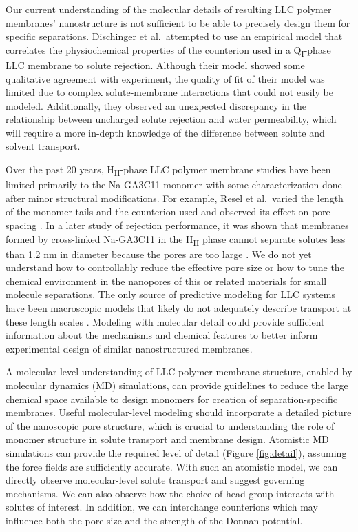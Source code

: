\documentclass[journal=jpcbfk,manuscript=article]{achemso}
\begin{document}
  Our current understanding of the molecular details of resulting LLC polymer membranes'
  nanostructure is not sufficient to be able to precisely design them for
  specific separations. Dischinger et al.~attempted to use an empirical model
  that correlates the physiochemical properties of the counterion used in a 
  Q\textsubscript{I}-phase LLC membrane to solute rejection\cite{dischinger_effect_2017}.
  Although their model showed some qualitative agreement with experiment, the
  quality of fit of their model was limited due to complex solute-membrane 
  interactions that could not easily be modeled. Additionally, they observed
  an unexpected discrepancy in the relationship between uncharged solute
  rejection and water permeability, which will require a more in-depth knowledge of
  the difference between solute and solvent transport.
  
  Over the past 20 years, H\textsubscript{II}-phase LLC
  polymer membrane studies have been limited primarily to the Na-GA3C11 monomer with some
  characterization done after minor structural modifications. For example, 
  Resel et al.~varied the length of the monomer tails and the counterion used and observed its effect
  on pore spacing \cite{resel_structural_2000}.  In a later study of rejection
  performance, it was shown that membranes formed by cross-linked Na-GA3C11 in
  the H\textsubscript{II} phase cannot separate solutes less than 1.2 nm in
  diameter because the pores are too large \cite{zhou_supported_2005}. We do not
  yet understand how to controllably reduce the effective pore size or how to
  tune the chemical environment in the nanopores of this or related materials for
  small molecule separations. The only source of predictive modeling for LLC
  systems have been macroscopic models that likely do not adequately describe
  transport at these length scales \cite{hatakeyama_water_2011}. Modeling with
  molecular detail could provide sufficient information about the mechanisms and
  chemical features to better inform experimental design of similar
  nanostructured membranes. 

  A molecular-level understanding of LLC polymer membrane structure, enabled by
  molecular dynamics (MD) simulations, can provide guidelines to reduce the large
  chemical space available to design monomers for creation of separation-specific
  membranes. Useful molecular-level modeling should incorporate a detailed
  picture of the nanoscopic pore structure, which is crucial to understanding the
  role of monomer structure in solute transport and membrane design.  Atomistic
  MD simulations can provide the required level of detail (Figure
  \ref{fig:detail}), assuming the force fields are sufficiently accurate.  With
  such an atomistic model, we can directly observe molecular-level solute
  transport and suggest governing mechanisms. We can also observe how the choice
  of head group interacts with solutes of interest. In addition, we can
  interchange counterions which may influence both the pore size and the strength
  of the Donnan potential. 
\end{document}
